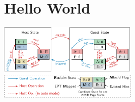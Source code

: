 \documentclass[12pt]{article}
\begin{document}
\section{Hello World}

\includegraphics[width=0.5\textwidth]{../examples/states}
\end{document}
